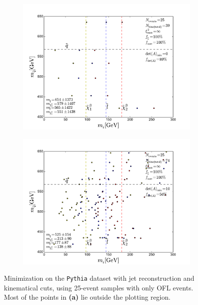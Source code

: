 \documentclass[twoside,english]{uiofysmaster}
\begin{document}
\begin{figure}[hbtp!]
	\centering
	\begin{subfigure}[b]{0.45\textwidth}
		\includegraphics[width=\textwidth]{figures/improving_combinatorics/pythia_jetrec_onlyOFL_25evbins_nodetAcut-nosmear_TMP.pdf} 
		\caption{ }
		\label{fig:event-pair-A-selection_pythia_4combosum-jetrec-OFL-25events_a}
	\end{subfigure}
	\begin{subfigure}[b]{0.45\textwidth}
		\includegraphics[width=\textwidth]{figures/improving_combinatorics/pythia_jetrec_onlyOFL_25evbins_detAcut10-nosmear_TMP.pdf}
		\caption{ }
		\label{fig:event-pair-A-selection_pythia_4combosum-jetrec-OFL-25events_b} 
	\end{subfigure}
	\caption{Minimization on the {\tt Pythia} dataset with jet reconstruction and kinematical cuts, using 25-event samples with only OFL events. Most of the points in {\bf (a)} lie outside the plotting region.}
	\label{fig:event-pair-A-selection_pythia_4combosum-jetrec-OFL-25events}
\end{figure}
\end{document}

